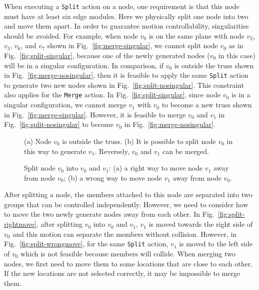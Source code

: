 \documentclass[journal]{IEEEtran}
\begin{document}
When executing a \texttt{Split} action on a node, one requirement is
that this node must have at least six edge modules. Here we physically
split one node into two and move them apart. In order to guarantee
motion controllability, singularities should be avoided. For example,
when node $v_0$ is on the same plane with node $v_2$, $v_3$, $v_6$,
and $v_7$ shown in Fig.~\ref{fig:merge-singular}, we cannot split node
$v_0$ as in Fig.~\ref{fig:split-singular}, because one of the newly
generated nodes ($v_0$ in this case) will be in a singular
configuration. In comparison, if $v_0$ is outside the truss shown in
Fig.~\ref{fig:merge-nosingular}, then it is feasible to apply the same
\texttt{Split} action to generate two new nodes shown in
Fig.~\ref{fig:split-nosingular}. This constraint also applies for the
\texttt{Merge} action. In Fig.~\ref{fig:split-singular}, since node
$v_0$ is in a singular configuration, we cannot merge $v_1$ with $v_0$
to become a new truss shown in Fig.~\ref{fig:merge-singular}. However,
it is feasible to merge $v_0$ and $v_1$ in
Fig.~\ref{fig:split-nosingular} to become $v_0$ in
Fig.~\ref{fig:merge-nosingular}.

\begin{figure}[t!]
  \centering
  \hfil
  \caption{(a) Node $v_0$ is outside the truss. (b) It is possible to
    split node $v_0$ in this way to generate $v_1$. Reversely, $v_0$
    and $v_1$ can be merged.}
\end{figure}

\begin{figure}[t]
  \centering
  \hfil
  \caption{Split node $v_0$ into $v_0$ and $v_1$: (a) a right way to
    move node $v_1$ away from node $v_0$; (b) a wrong way to move node
    $v_1$ away from node $v_0$.}
\end{figure}

After splitting a node, the members attached to this node are
separated into two groups that can be controlled
independently. However, we need to consider how to move the two newly
generate nodes away from each other. In
Fig.~\ref{fig:split-rightmove}, after splitting $v_0$ into $v_0$ and
$v_1$, $v_1$ is moved towards the right side of $v_0$ and this motion
can separate the members without collision. However, in
Fig.~\ref{fig:split-wrongmove}, for the same \texttt{Split} action,
$v_1$ is moved to the left side of $v_0$ which is not feasible because
members will collide.  When merging two nodes, we first need to move
them to some locations that are close to each other. If the new
locations are not selected correctly, it may be impossible to merge
them.
\end{document}
